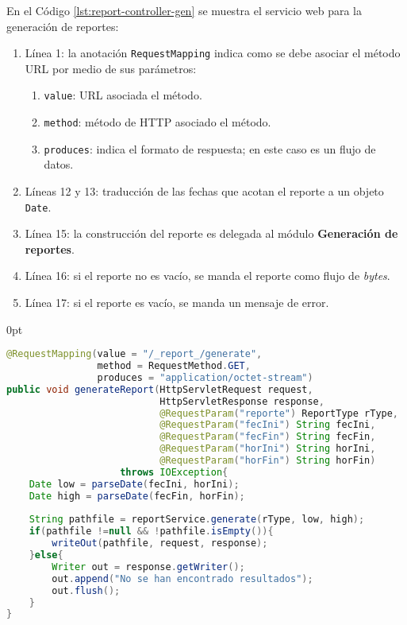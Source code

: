 \begin{enumerate}
	En el Código \ref{lst:report-controller-gen} se muestra el servicio web para la generación de reportes:
	\begin{enumerate}
		\item Línea 1: la anotación \texttt{RequestMapping} indica como se debe asociar el método URL por medio de sus parámetros:
		\begin{enumerate}
			\item \texttt{value}: URL asociada el método.
			\item \texttt{method}: método de HTTP asociado el método.
			\item \texttt{produces}: indica el formato de respuesta; en este caso es un flujo de datos.
		\end{enumerate}
		\item Líneas 12 y 13: traducción de las fechas que acotan el reporte a un objeto \texttt{Date}.
		\item Línea 15: la construcción del reporte es delegada al módulo \textbf{Generación de reportes}.
		\item Línea 16: si el reporte no es vacío, se manda el reporte como flujo de \textit{bytes}.
		\item Línea 17: si el reporte es vacío, se manda un mensaje de error.
	\end{enumerate}


\begin{adjustwidth}{\listingfixwidth}{0pt}
\begin{lstlisting}[language=Java, caption={Servicio web para generar un reporte.}, captionpos=b, label={lst:report-controller-gen}]
@RequestMapping(value = "/_report_/generate",
				method = RequestMethod.GET,
				produces = "application/octet-stream")
public void generateReport(HttpServletRequest request,
						   HttpServletResponse response,
						   @RequestParam("reporte") ReportType rType,
						   @RequestParam("fecIni") String fecIni,
						   @RequestParam("fecFin") String fecFin,
						   @RequestParam("horIni") String horIni,
						   @RequestParam("horFin") String horFin)
					throws IOException{
	Date low = parseDate(fecIni, horIni);
	Date high = parseDate(fecFin, horFin);
	
	String pathfile = reportService.generate(rType, low, high);
	if(pathfile !=null && !pathfile.isEmpty()){
		writeOut(pathfile, request, response);
	}else{
		Writer out = response.getWriter();
		out.append("No se han encontrado resultados");
		out.flush();
	}
}
\end{lstlisting}
\end{adjustwidth}

\end{enumerate}


